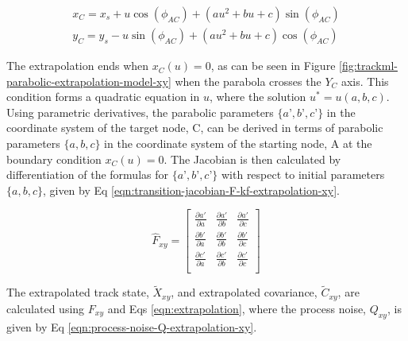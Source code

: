 \begin{equation}
\begin{aligned}
x_C = x_s + u\cos(\phi_{AC}) + (au^2 + bu + c)\sin(\phi_{AC}) \\
y_C = y_s - u\sin(\phi_{AC}) + (au^2 + bu + c)\cos(\phi_{AC})
\end{aligned}
\label{eqn:rotation-parabolic-linear-algebra}
\end{equation}


The extrapolation ends when $x_{C}(u) = 0$, as can be seen in Figure \ref{fig:trackml-parabolic-extrapolation-model-xy} when the parabola crosses the $Y_C$ axis. This condition forms a quadratic equation in $u$, where the solution $u^{*} = u(a, b, c)$. Using parametric derivatives, the parabolic parameters $\{a’, b’, c’ \}$ in the coordinate system of the target node, C, can be derived in terms of parabolic parameters $\{a, b, c \}$ in the coordinate system of the starting node, A at the boundary condition $x_{C}(u) = 0$. The Jacobian is then calculated by differentiation of the formulas for $\{a’, b’, c’ \}$ with respect to initial parameters $\{a, b, c \}$, given by Eq \eqref{eqn:transition-jacobian-F-kf-extrapolation-xy}.  



\begin{equation}
\hat{F}_{xy} = \begin{bmatrix} 
        \frac{\partial a'}{\partial a} & \frac{\partial a'}{\partial b} & \frac{\partial a'}{\partial c} \\ 
        
        \frac{\partial b'}{\partial a} & \frac{\partial b'}{\partial b} & \frac{\partial b'}{\partial c} \\
        
        \frac{\partial c'}{\partial a} & \frac{\partial c'}{\partial b} & \frac{\partial c'}{\partial c} \\
        \end{bmatrix} 
\label{eqn:transition-jacobian-F-kf-extrapolation-xy}
\end{equation}


The extrapolated track state, $\tilde{X}_{xy}$, and extrapolated covariance, $\tilde{C}_{xy}$, are calculated using $F_{xy}$ and Eqs \eqref{eqn:extrapolation}, where the process noise, $Q_{xy}$, is given by Eq \eqref{eqn:process-noise-Q-extrapolation-xy}.

